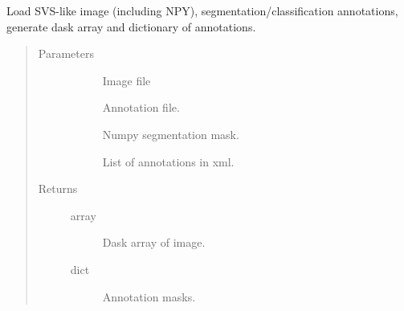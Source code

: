 \documentclass[letterpaper,10pt,english]{sphinxmanual}
\begin{document}

\begin{fulllineitems}
\label{\detokenize{index:pathflowai.utils.load_process_image}}
Load SVS-like image (including NPY), segmentation/classification annotations, generate dask array and dictionary of annotations.
\begin{quote}\begin{description}
\item[{Parameters}] \leavevmode\begin{description}
\item[{}] \leavevmode
Image file

\item[{}] \leavevmode
Annotation file.

\item[{}] \leavevmode
Numpy segmentation mask.

\item[{}] \leavevmode
List of annotations in xml.

\end{description}

\item[{Returns}] \leavevmode\begin{description}
\item[{array}] \leavevmode
Dask array of image.

\item[{dict}] \leavevmode
Annotation masks.

\end{description}

\end{description}\end{quote}

\end{fulllineitems}

\end{document}

